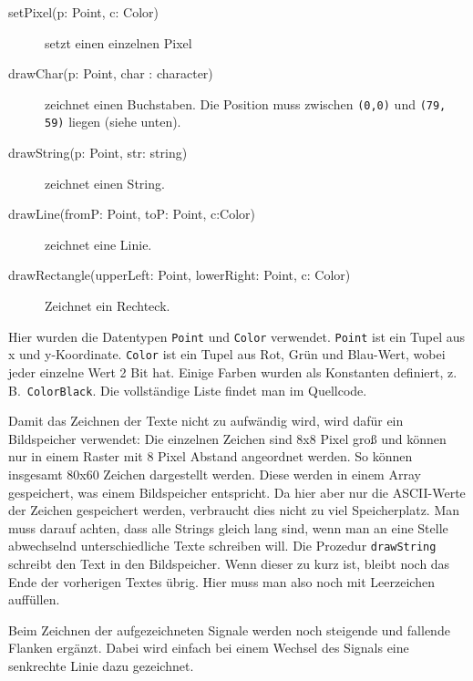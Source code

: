 \documentclass[IN,ngerman,utf8,12pt]{tumbook}
\newcommand{\zB}{z.\,B.\ }
\begin{document}
\begin{description}
    \item[setPixel(p: Point, c: Color)] setzt einen einzelnen Pixel
    \item[drawChar(p: Point, char : character)] zeichnet einen Buchstaben.
        Die Position muss zwischen \texttt{(0,0)} und \texttt{(79, 59)} liegen (siehe unten).
    \item[drawString(p: Point, str: string)] zeichnet einen String.
    \item[drawLine(fromP: Point, toP: Point, c:Color)] zeichnet eine Linie.
    \item[drawRectangle(upperLeft: Point, lowerRight: Point, c: Color)] Zeichnet ein Rechteck.
\end{description}

Hier wurden die Datentypen \texttt{Point} und \texttt{Color} verwendet.
\texttt{Point} ist ein Tupel aus x und y-Koordinate.
\texttt{Color} ist ein Tupel aus Rot, Grün und Blau-Wert, wobei jeder einzelne Wert 2 Bit hat.
Einige Farben wurden als Konstanten definiert, \zB \texttt{ColorBlack}.
Die vollständige Liste findet man im Quellcode.

Damit das Zeichnen der Texte nicht zu aufwändig wird, wird dafür ein Bildspeicher verwendet:
Die einzelnen Zeichen sind 8x8 Pixel groß und können nur in einem Raster mit 8 Pixel Abstand angeordnet werden.
So können insgesamt 80x60 Zeichen dargestellt werden.
Diese werden in einem Array gespeichert, was einem Bildspeicher entspricht.
Da hier aber nur die ASCII-Werte der Zeichen gespeichert werden, verbraucht dies nicht zu viel Speicherplatz.
Man muss darauf achten, dass alle Strings gleich lang sind, wenn man an eine Stelle abwechselnd unterschiedliche Texte schreiben will.
Die Prozedur \texttt{drawString} schreibt den Text in den Bildspeicher.
Wenn dieser zu kurz ist, bleibt noch das Ende der vorherigen Textes übrig.
Hier muss man also noch mit Leerzeichen auffüllen.

Beim Zeichnen der aufgezeichneten Signale werden noch steigende und fallende Flanken ergänzt.
Dabei wird einfach bei einem Wechsel des Signals eine senkrechte Linie dazu gezeichnet.
\end{document}
